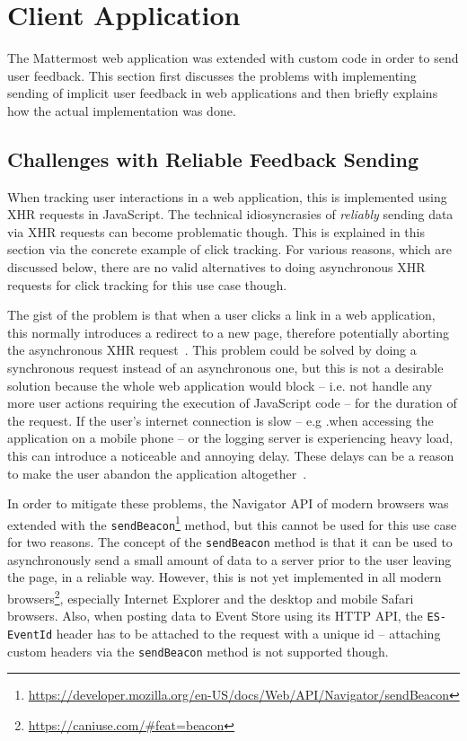 \section{Client Application}
\label{sec:implementation:client}

The Mattermost web application was extended with custom code in order to send user feedback.
This section first discusses the problems with implementing sending of implicit user feedback in web applications and then briefly explains how the actual implementation was done.

\subsection{Challenges with Reliable Feedback Sending}
\label{subsec:implementation:client:problems}

When tracking user interactions in a web application, this is implemented using \ac{XHR} requests in JavaScript.
The technical idiosyncrasies of \emph{reliably} sending data via \ac{XHR} requests can become problematic though.
This is explained in this section via the concrete example of click tracking.
For various reasons, which are discussed below, there are no valid alternatives to doing asynchronous \ac{XHR} requests for click tracking for this use case though.

The gist of the problem is that when a user clicks a link in a web application, this normally introduces a redirect to a new page, therefore potentially aborting the asynchronous \ac{XHR} request~\cite{Kohavi2010}.
This problem could be solved by doing a synchronous request instead of an asynchronous one, but this is not a desirable solution because the whole web application would block -- i.e. not handle any more user actions requiring the execution of JavaScript code -- for the duration of the request.
If the user's internet connection is slow -- e.g .when accessing the application on a mobile phone -- or the logging server is experiencing heavy load, this can introduce a noticeable and annoying delay.
These delays can be a reason to make the user abandon the application altogether~\cite{Kohavi2010,Dmitriev2017}.

In order to mitigate these problems, the Navigator \ac{API} of modern browsers was extended with the \texttt{sendBeacon}\footnote{\url{https://developer.mozilla.org/en-US/docs/Web/API/Navigator/sendBeacon}} method, but this cannot be used for this use case for two reasons.
The concept of the \texttt{sendBeacon} method is that it can be used to asynchronously send a small amount of data to a server prior to the user leaving the page, in a reliable way.
However, this is not yet implemented in all modern browsers\footnote{\url{https://caniuse.com/\#feat=beacon}}, especially Internet Explorer and the desktop and mobile Safari browsers.
Also, when posting data to Event Store using its \ac{HTTP} \ac{API}, the \texttt{ES-EventId} header has to be attached to the request with a unique id -- attaching custom headers via the \texttt{sendBeacon} method is not supported though.

